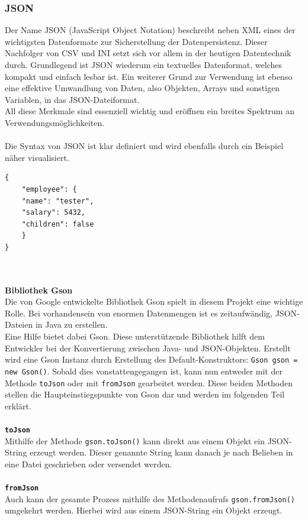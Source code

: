 \subsubsection{JSON}
Der Name JSON (JavaScript Object Notation) beschreibt neben XML eines der wichtigsten Datenformate zur Sicherstellung der Datenpersistenz.
Dieser Nachfolger von CSV und INI setzt sich vor allem in der heutigen Datentechnik durch.
Grundlegend ist JSON wiederum ein textuelles Datenformat, welches kompakt und einfach lesbar ist.
Ein weiterer Grund zur Verwendung ist ebenso eine effektive Umwandlung von Daten, also Objekten, Arrays und sonstigen Variablen, in das JSON-Dateiformat.\\
All diese Merkmale sind essenziell wichtig und eröffnen ein breites Spektrum an Verwendungsmöglichkeiten.\\\\
Die Syntax von JSON ist klar definiert und wird ebenfalls durch ein Beispiel näher visualisiert.
\begin{lstlisting}[style=json, caption=JSON-Codebeispiel,label=jsonExample]
{
    "employee": {
    "name": "tester",
    "salary": 5432,
    "children": false
    }
}
\end{lstlisting}
\\\\
\textbf{Bibliothek Gson}\\
Die von Google entwickelte Bibliothek Gson spielt in diesem Projekt eine wichtige Rolle.
Bei vorhandensein von enormen Datenmengen ist es zeitaufwändig, JSON-Dateien in Java zu erstellen.\\
Eine Hilfe bietet dabei Gson.
Diese unterstützende Bibliothek hilft dem Entwickler bei der Konvertierung zwischen Java- und JSON-Objekten.
Erstellt wird eine Gson Instanz durch Erstellung des Default-Konstruktors: \lstinline[style=java]{Gson gson = new Gson()}.
Sobald dies vonstattengegangen ist, kann nun entweder mit der Methode \lstinline{toJson} oder mit \lstinline{fromJson} gearbeitet werden.
Diese beiden Methoden stellen die Haupteinstiegspunkte von Gson dar und werden im folgenden Teil erklärt.
\\\\
\textbf{\lstinline{toJson}}
\\
Mithilfe der Methode \lstinline[style=java]{gson.toJson()} kann direkt aus einem Objekt ein JSON-String erzeugt werden.
Dieser genannte String kann danach je nach Belieben in eine Datei geschrieben oder versendet werden.
\\\\
\textbf{\lstinline{fromJson}}
\\
Auch kann der gesamte Prozess mithilfe des Methodenaufrufs \lstinline[style=java]{gson.fromJson()} umgekehrt werden.
Hierbei wird aus einem JSON-String ein Objekt erzeugt.
\\
